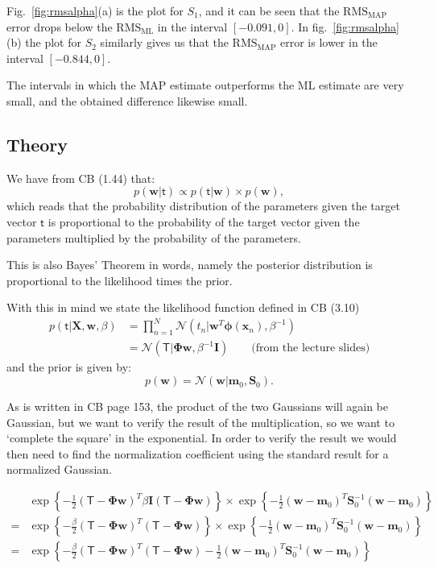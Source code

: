 \documentclass{article}
\newcommand{\vect}[1]{\ensuremath{\boldsymbol{\mathbf{#1}}}\xspace}
\newcommand{\Target}{\vect{\mathsf{T}}}
\newcommand{\vPhi}{\vect{\Phi}}
\newcommand{\vw}{\vect{w}}
\newcommand{\Szero}{\vect{S}_0}
\newcommand{\mzero}{\vect{m}_0}
\newcommand{\target}{\vect{\mathsf{t}}}
\begin{document}
Fig.~\ref{fig:rmsalpha}(a) is the plot for $S_1$, and it can be seen
that the $\mathrm{RMS}_\mathrm{MAP}$ error drops below the
$\mathrm{RMS}_\mathrm{ML}$ in the interval $[-0.091,0]$. In
fig.~\ref{fig:rmsalpha}(b) the plot for $S_2$ similarly gives us that
the $\mathrm{RMS}_\mathrm{MAP}$ error is lower in the interval
$[-0.844,0]$.

The intervals in which the MAP estimate outperforms the ML estimate
are very small, and the obtained difference likewise small.

\newpage
\subsection{Theory}

We have from CB (1.44) that:
\[
p(\vect{w}|\vect{\mathsf{t}}) \propto p(\vect{\mathsf{t}}|\vect{w})\times p(\vect{w}),
\]
which reads that the probability distribution of the parameters given
the target vector $\vect{\mathsf{t}}$ is proportional to the
probability of the target vector given the parameters multiplied by
the probability of the parameters.

This is also Bayes' Theorem in words, namely the posterior
distribution is proportional to the likelihood times the prior.

With this in mind we state the likelihood function defined in CB
(3.10)
\begin{align*}
  p(\target |\vect{X}, \vect{w}, \beta) &= \prod_{n=1}^N \mathcal{N}(t_n | \vect{w}^T\vect{\phi}(\vect{x}_n), \beta^{-1})\label{eq:likelihood}\\
  &= \mathcal{N}(\vect{\mathsf{T}} | \vect{\Phi}\vect{w}, \beta^{-1}\vect{I}) \qquad\text{(from the lecture slides)}
\end{align*}
and the prior is given by:
\[
  p(\vect{w}) = \mathcal{N}(\vect{w}|\vect{m}_0,\vect{S}_0).
\]

As is written in CB page 153, the product of the two Gaussians will
again be Gaussian, but we want to verify the result of the
multiplication, so we want to `complete the square' in the
exponential. In order to verify the result we would then need to find the normalization coefficient using the
standard result for a normalized Gaussian.

\begin{align}
  \nonumber  & \exp\left\{-\frac{1}{2}(\Target - \vPhi\vw)^T \beta\vect{I} (\Target -
  \vPhi\vw)\right\} \times \exp\left\{ -\frac{1}{2}(\vw -
  \mzero)^T\Szero^{-1}(\vw - \mzero)\right\}\\
  \nonumber = & \exp\left\{-\frac{\beta}{2}(\Target - \vPhi\vw)^T (\Target -
  \vPhi\vw)\right\} \times \exp\left\{ -\frac{1}{2}(\vw -
  \mzero)^T\Szero^{-1}(\vw - \mzero)\right\}\\
  = & \exp\left\{-\frac{\beta}{2}(\Target - \vPhi\vw)^T (\Target -
  \vPhi\vw) -\frac{1}{2}(\vw - \mzero)^T\Szero^{-1}(\vw - \mzero)\right\}\label{eq:expgauss}
\end{align}
\end{document}
